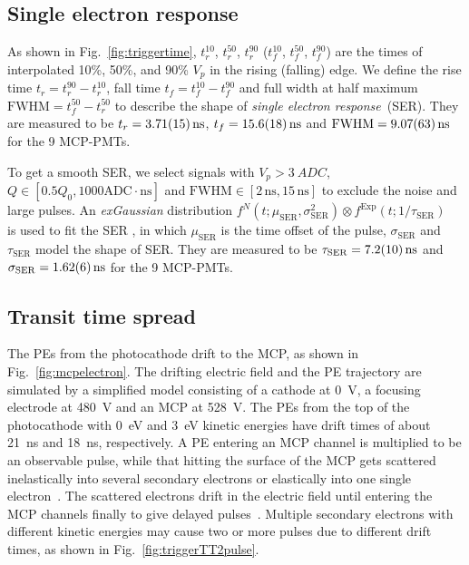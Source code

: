 \subsection{Single electron response}
As shown in Fig.~\ref{fig:triggertime}, $t^{10}_r$, $t^{50}_r$, $t^{90}_r$ ($t^{10}_f$, $t^{50}_f$, $t^{90}_f$) are the times of interpolated 10\%, 50\%, and 90\% $V_p$ in the rising (falling) edge. We define the rise time $t_r = t^{90}_r - t^{10}_r$, fall time $t_f = t^{10}_f - t^{90}_f$ and full width at half maximum $\mathrm{FWHM} = t^{50}_f - t^{50}_r$ to describe the shape of \emph{single electron response}~(SER).  They are measured to be $t_r = \SI{3.71\pm0.15}{ns}$, $t_f = \SI{15.6\pm1.8}{ns}$ and $\mathrm{FWHM} = \SI{9.07\pm0.63}{ns}$ for the 9 MCP-PMTs.

To get a smooth SER, we select signals with $V_p>\SI{3}{ADC}$, $Q \in [0.5Q_0, 1000\mathrm{ADC\cdot ns}]$ and $\mathrm{FWHM} \in [2\,\mathrm{ns}, 15\,\mathrm{ns}]$ to exclude the noise and large pulses. An \emph{exGaussian} distribution $f^N(t;\mu_{\mathrm{SER}},\sigma_\mathrm{SER}^2)\otimes f^{\mathrm{Exp}}(t;1/\tau_\mathrm{SER})$~\cite{Luo:2022xrd} is used to fit the SER%
, in which $\mu_{\mathrm{SER}}$ is the time offset of the pulse, $\sigma_{\mathrm{SER}}$ and $\tau_{\mathrm{SER}}$ model the shape of SER. They are measured to be $\tau_{\mathrm{SER}} = \SI{7.2\pm1.0}{ns}$ and $\sigma_{\mathrm{SER}} = \SI{1.62\pm0.06}{ns}$ for the 9 MCP-PMTs.

\subsection{Transit time spread}
The PEs from the photocathode drift to the MCP, as shown in Fig.~\ref{fig:mcpelectron}. The drifting electric field and the PE trajectory are simulated by a simplified model consisting of a cathode at \SI{0}{V}, a focusing electrode at \SI{480}{V} and an MCP at \SI{528}{V}. The PEs from the top of the photocathode with \SI{0}{eV} and \SI{3}{eV} kinetic energies have drift times of about \SI{21}{ns} and \SI{18}{ns}, respectively. A PE entering an MCP channel is multiplied to be an observable pulse, while that hitting the surface of the MCP gets scattered inelastically into several secondary electrons or elastically into one single electron~\cite{Furman}. The scattered electrons drift in the electric field until entering the MCP channels finally to give delayed pulses~\cite{KM3NetTesting}. Multiple secondary electrons with different kinetic energies may cause two or more pulses due to different drift times, as shown in Fig.~\ref{fig:triggerTT2pulse}.


